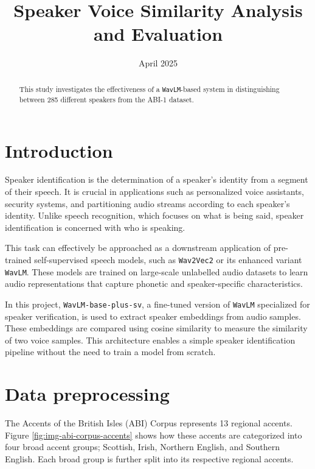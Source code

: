 \documentclass[conference]{IEEEtran}
\begin{document}
	
\title{Speaker Voice Similarity Analysis and Evaluation}

	
\author{
	\date{April 2025}
	
}

\maketitle

\begin{abstract}
This study investigates the effectiveness of a \texttt{WavLM}-based system in distinguishing between 285 different speakers from the ABI-1 dataset. \end{abstract}



\section{Introduction}

Speaker identification is the determination of a speaker's identity from a segment of their speech. It is crucial in applications such as personalized voice assistants, security systems, and partitioning audio streams according to each speaker's identity. Unlike speech recognition, which focuses on what is being said, speaker identification is concerned with who is speaking.

This task can effectively be approached as a downstream application of pre-trained self-supervised speech models, such as \texttt{Wav2Vec2}\cite{baevski2020wav2vec} or its enhanced variant \texttt{WavLM}\cite{chen2022wavlm}. These models are trained on large-scale unlabelled audio datasets to learn audio representations that capture phonetic and speaker-specific characteristics.

In this project, \texttt{WavLM-base-plus-sv}, a fine-tuned version of \texttt{WavLM} specialized for speaker verification, is used to extract speaker embeddings from audio samples. These embeddings are compared using cosine similarity to measure the similarity of two voice samples. This architecture enables a simple speaker identification pipeline without the need to train a model from scratch.


\section{Data preprocessing}
\label{sec:data-processing}

The Accents of the British Isles (ABI) Corpus represents 13 regional accents. Figure \ref{fig:img-abi-corpus-accents} shows how these accents are categorized into four broad accent groups; Scottish, Irish, Northern English, and Southern English. Each broad group is further split into its respective regional accents\cite{najafian2016improving}.
\end{document}
